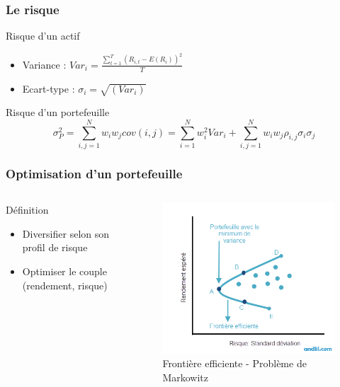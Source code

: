 \begin{frame}
    \frametitle{Le risque} 
    \begin{block}{Risque d'un actif}
	\begin{itemize}
	 \item Variance :  $Var_i = \frac{\sum_{t=1}^T (R_{i,t}-E(R_{i}))^2}{T} $
	 \item Ecart-type :  $ \sigma_i = \sqrt{(Var_i)}$
	\end{itemize}
    \end{block}
    \begin{block}{Risque d'un portefeuille}
	\[\sigma_P^2 = \sum_{i,j=1}^{N}w_iw_jcov(i,j) = \sum_{i=1}^{N}w_i^2Var_i +  \sum_{i,j=1}^{N}w_iw_j\rho_{i,j}\sigma_i\sigma_j\]
    \end{block}
\end{frame}

\begin{frame}
    \frametitle{Optimisation d'un portefeuille} 
    \begin{columns}
      \begin{column}{4.5cm}
	  \begin{block}{Définition}
	      \begin{itemize}
		\item Diversifier selon son profil de risque
		\item Optimiser le couple (rendement, risque)
	      \end{itemize}
	  \end{block}
      \end{column}
      \begin{column}{5.5cm}
	  \begin{figure}
	      \center
	      \includegraphics[scale=0.3]{images/frontiereEfficiente.png}   
	      \caption{Frontière efficiente - Problème de Markowitz}
	  \end{figure} 
      \end{column}
    \end{columns}
\end{frame}

